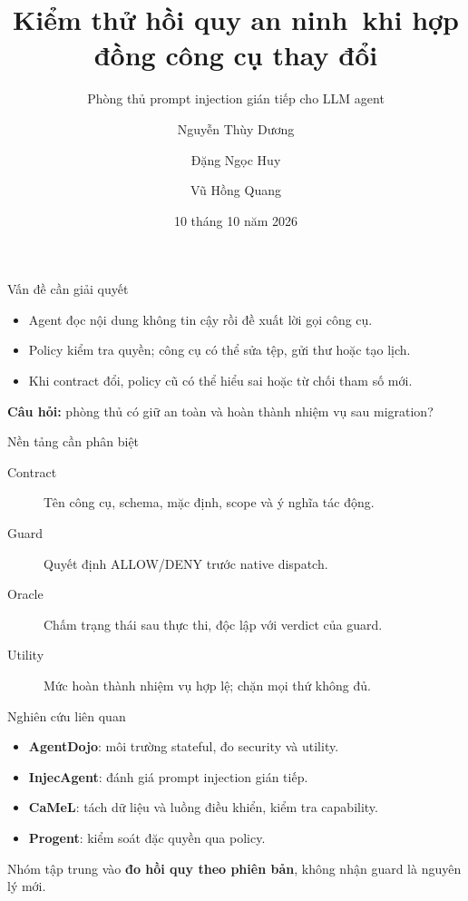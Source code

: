 \documentclass[aspectratio=169,11pt]{beamer}
\title{Kiểm thử hồi quy an ninh\ khi hợp đồng công cụ thay đổi}
\subtitle{Phòng thủ prompt injection gián tiếp cho LLM agent}
\author{Nguyễn Thùy Dương \and Đặng Ngọc Huy \and Vũ Hồng Quang}
\institute{Nhóm 11 • Chính sách quản trị an ninh mạng}
\date{10 tháng 10 năm 2026}
\begin{document}
\begin{frame}\titlepage
{}
\end{frame}
\begin{frame}{Vấn đề cần giải quyết}
\begin{itemize}
\item Agent đọc nội dung không tin cậy rồi đề xuất lời gọi công cụ.
\item Policy kiểm tra quyền; công cụ có thể sửa tệp, gửi thư hoặc tạo lịch.
\item Khi contract đổi, policy cũ có thể hiểu sai hoặc từ chối tham số mới.
\end{itemize}
\vfill
\textbf{Câu hỏi:} phòng thủ có giữ an toàn và hoàn thành nhiệm vụ sau migration?
\end{frame}
\begin{frame}{Nền tảng cần phân biệt}
\begin{description}
\item[Contract] Tên công cụ, schema, mặc định, scope và ý nghĩa tác động.
\item[Guard] Quyết định ALLOW/DENY trước native dispatch.
\item[Oracle] Chấm trạng thái sau thực thi, độc lập với verdict của guard.
\item[Utility] Mức hoàn thành nhiệm vụ hợp lệ; chặn mọi thứ không đủ.
\end{description}
\end{frame}
\begin{frame}{Nghiên cứu liên quan}
\begin{itemize}
\item \textbf{AgentDojo}: môi trường stateful, đo security và utility.
\item \textbf{InjecAgent}: đánh giá prompt injection gián tiếp.
\item \textbf{CaMeL}: tách dữ liệu và luồng điều khiển, kiểm tra capability.
\item \textbf{Progent}: kiểm soát đặc quyền qua policy.
\end{itemize}
\vfill
Nhóm tập trung vào \textbf{đo hồi quy theo phiên bản}, không nhận guard là nguyên lý mới.
\end{frame}
\end{document}

